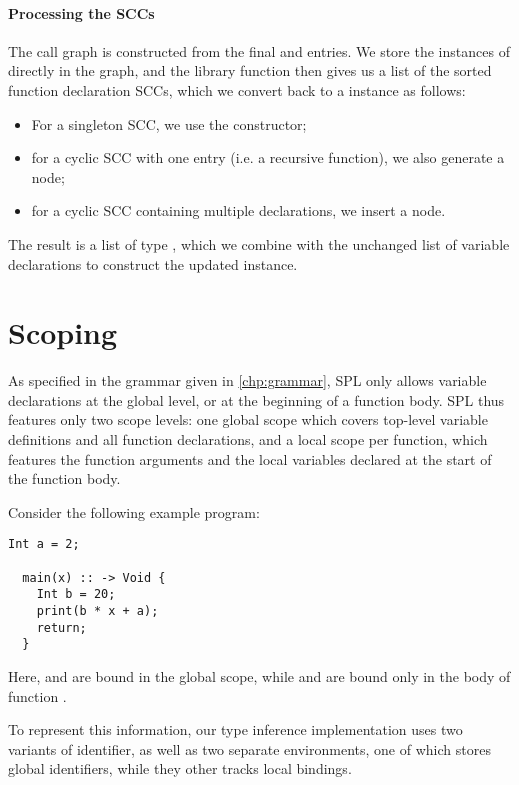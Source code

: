 \paragraph{Processing the SCCs}
The call graph is constructed from the final  and 
entries. We store the instances of  directly in the graph, and
the library function  then gives us a list of the sorted
function declaration SCCs, which we convert back to a  instance
as follows:
\begin{itemize}
  \item For a singleton SCC, we use the  constructor;
  \item for a cyclic SCC with one entry (i.e. a recursive function), we
        also generate a  node;
  \item for a cyclic SCC containing multiple declarations, we insert a
         node.
\end{itemize}
%
The result is a list of type , which we combine with
the unchanged list of variable declarations to construct the updated
 instance.



\section{Scoping}
As specified in the grammar given in \cref{chp:grammar}, SPL only allows
variable declarations at the global level, or at the beginning of a function
body. SPL thus features only two scope levels: one global scope which covers
top-level variable definitions and all function declarations, and a local scope
per function, which features the function arguments and the local variables
declared at the start of the function body.

Consider the following example program:
%
\begin{lstlisting}[language=SPL]
  Int a = 2;

  main(x) :: -> Void {
    Int b = 20;
    print(b * x + a);
    return;
  }
\end{lstlisting}
%
Here,  and  are bound in the global scope, while  and
 are bound only in the body of function .

To represent this information, our type inference implementation uses two
variants of identifier, as well as two separate environments, one of which
stores global identifiers, while they other tracks local bindings.

